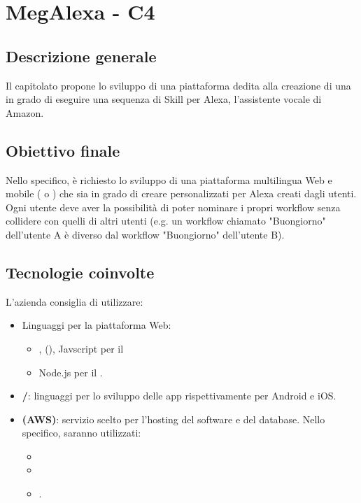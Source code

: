 \section{MegAlexa - C4} \label{c4}

    \subsection{Descrizione generale}
    Il capitolato propone lo sviluppo di una piattaforma
    dedita alla creazione di una  in grado di eseguire una sequenza
    di Skill per Alexa, l'assistente vocale di Amazon.

    \subsection{Obiettivo finale}
    Nello specifico, \`e richiesto lo sviluppo di una piattaforma multilingua Web e
    mobile ( o ) che sia in grado di
    creare  personalizzati per Alexa creati dagli utenti. Ogni utente
    deve aver la possibilit\`a di poter nominare i propri workflow senza collidere con
    quelli di altri utenti (e.g. un workflow chiamato "Buongiorno" dell'utente A \`e
    diverso dal workflow "Buongiorno" dell'utente B).

    \subsection{Tecnologie coinvolte}
    L'azienda consiglia di utilizzare:
    \begin{itemize}
    	\item Linguaggi per la piattaforma Web:
    	\begin{itemize}
            \item {},  (), Javscript
                per il 
            \item Node.js per il .
    	\end{itemize}
        \item \textbf{/}: linguaggi per lo sviluppo delle app
            rispettivamente per Android e iOS.
        \item \textbf{ (AWS)}: servizio scelto per l'hosting del software e del database.
            Nello specifico, saranno utilizzati:
            \begin{itemize}
                \item {}
                \item {}
                \item {}.
            \end{itemize}
    \end{itemize}

